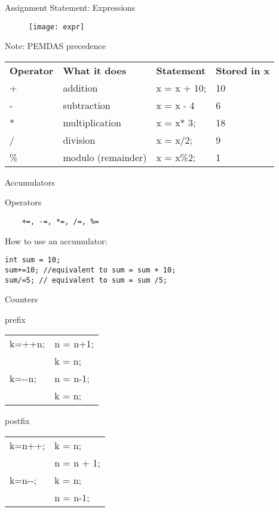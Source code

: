 \documentclass[xcolor={dvipsnames}]{beamer}
\begin{document}
\begin{frame}{Assignment Statement: Expressions}
\begin{figure}
	\texttt{[image: expr]}
\end{figure}

\begin{block}{Note: PEMDAS precedence}
	\begin{tabularx}{\textwidth}{X X X X}
		\textbf{Operator} & \textbf{What it does} & \textbf{Statement} & \textbf{Stored in x}\\
		+ & addition & x = x + 10; & 10 \\
		- & subtraction & x = x - 4 & 6 \\
		*& multiplication & x = x* 3; &  18 \\
		/ & division & x = x/2; & 9 \\
		\% & modulo (remainder) &  x = x\%2; & 1 \\  
	\end{tabularx}
\end{block}
\end{frame}

\begin{frame}[fragile]{Accumulators}
\begin{block}{Operators}
\huge
\begin{verbatim}	
	+=, -=, *=, /=, %=
\end{verbatim}

\end{block}
	
\begin{block}{How to use an accumulator:}
\begin{verbatim}
int sum = 10;
sum+=10; //equivalent to sum = sum + 10;
sum/=5; // equivalent to sum = sum /5;
\end{verbatim}
	\end{block}
\end{frame}

\begin{frame}[fragile]{Counters}
	\center
\begin{block}{prefix}
	\begin{tabularx}{\textwidth}{| X | X |}
		\hline
		k=++n;& n = n+1; \\
			   & k = n;\\
		\hline
		k=$\text{-}\text{-}$n; &  n = n-1;\\
			&  k = n;\\
		\hline
	\end{tabularx}	
\end{block}
\begin{block}{postfix}
	\begin{tabularx}{\textwidth}{| X | X |}
		\hline
		k=n++; & k = n; \\
			   & n = n + 1;\\
		\hline
		k=n$\text{-}\text{-}$; & k = n;\\
					     &  n = n-1;\\
		\hline
	\end{tabularx}
\end{block}
\end{frame}
\end{document}

